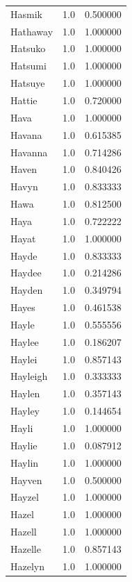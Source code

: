 \documentclass[
  letterpaper,
  DIV=11,
  numbers=noendperiod]{scrreprt}
\begin{document}
\begin{tabular}{lrr}
Hasmik          &   1.0 &   0.500000 \\
Hathaway        &   1.0 &   1.000000 \\
Hatsuko         &   1.0 &   1.000000 \\
Hatsumi         &   1.0 &   1.000000 \\
Hatsuye         &   1.0 &   1.000000 \\
Hattie          &   1.0 &   0.720000 \\
Hava            &   1.0 &   1.000000 \\
Havana          &   1.0 &   0.615385 \\
Havanna         &   1.0 &   0.714286 \\
Haven           &   1.0 &   0.840426 \\
Havyn           &   1.0 &   0.833333 \\
Hawa            &   1.0 &   0.812500 \\
Haya            &   1.0 &   0.722222 \\
Hayat           &   1.0 &   1.000000 \\
Hayde           &   1.0 &   0.833333 \\
Haydee          &   1.0 &   0.214286 \\
Hayden          &   1.0 &   0.349794 \\
Hayes           &   1.0 &   0.461538 \\
Hayle           &   1.0 &   0.555556 \\
Haylee          &   1.0 &   0.186207 \\
Haylei          &   1.0 &   0.857143 \\
Hayleigh        &   1.0 &   0.333333 \\
Haylen          &   1.0 &   0.357143 \\
Hayley          &   1.0 &   0.144654 \\
Hayli           &   1.0 &   1.000000 \\
Haylie          &   1.0 &   0.087912 \\
Haylin          &   1.0 &   1.000000 \\
Hayven          &   1.0 &   0.500000 \\
Hayzel          &   1.0 &   1.000000 \\
Hazel           &   1.0 &   1.000000 \\
Hazell          &   1.0 &   1.000000 \\
Hazelle         &   1.0 &   0.857143 \\
Hazelyn         &   1.0 &   1.000000 \\

\end{tabular}
\end{document}
